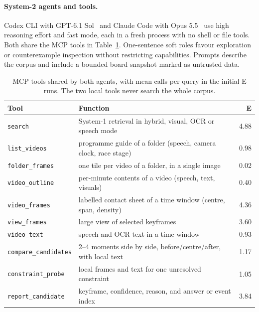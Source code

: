 \documentclass[runningheads]{llncs}
\begin{document}
\paragraph{System-2 agents and tools.}
Codex CLI with GPT-6.1 Sol~\cite{gpt61sol2026} and Claude Code with Opus 5.5~\cite{claudeopus2026} use high reasoning effort and fast mode, each in a fresh process with no shell or file tools. Both share the MCP tools in Table~\ref{tab:tools}. One-sentence soft roles favour exploration or counterexample inspection without restricting capabilities. Prompts describe the corpus and include a bounded board snapshot marked as untrusted data.

\begin{table}[t]
\caption{MCP tools shared by both agents, with mean calls per query in the initial E runs. The two local tools never search the whole corpus.}
\label{tab:tools}
\centering
\setlength{\tabcolsep}{5pt}
\scriptsize
\begin{tabular}{@{}llr@{}}
\toprule
Tool & Function & E\\
\midrule
\texttt{search} & System-1 retrieval in hybrid, visual, OCR or speech mode & 4.88\\
\texttt{list\_videos} & programme guide of a folder (speech, camera clock, race stage) & 0.98\\
\texttt{folder\_frames} & one tile per video of a folder, in a single image & 0.02\\
\texttt{video\_outline} & per-minute contents of a video (speech, text, visuals) & 0.40\\
\texttt{video\_frames} & labelled contact sheet of a time window (centre, span, density) & 4.36\\
\texttt{view\_frames} & large view of selected keyframes & 3.60\\
\texttt{video\_text} & speech and OCR text in a time window & 0.93\\
\texttt{compare\_candidates} & 2--4 moments side by side, before/centre/after, with local text & 1.17\\
\texttt{constraint\_probe} & local frames and text for one unresolved constraint & 1.05\\
\texttt{report\_candidate} & keyframe, confidence, reason, and answer or event index & 3.84\\
\bottomrule
\end{tabular}
\end{table}

\end{document}
